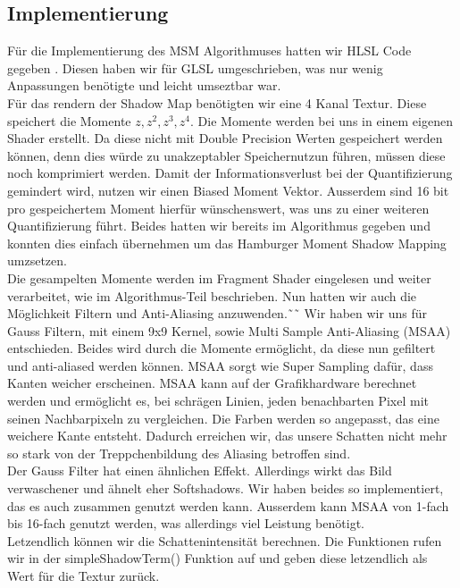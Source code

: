 \documentclass[runningheaders,a4paper]{llncs}
\begin{document}
\subsection{Implementierung}
Für die Implementierung des MSM Algorithmuses hatten wir HLSL Code gegeben \cite{msm}.
Diesen haben wir für GLSL umgeschrieben, was nur wenig Anpassungen benötigte und leicht umseztbar war.\\
Für das rendern der Shadow Map benötigten wir eine 4 Kanal Textur. Diese speichert die Momente $z,z^2,z^3,z^4$. Die Momente werden bei uns in einem eigenen Shader erstellt. Da diese nicht mit Double Precision Werten gespeichert werden können, denn dies würde zu unakzeptabler Speichernutzun führen, müssen diese noch komprimiert werden. Damit der Informationsverlust bei der Quantifizierung gemindert wird, nutzen wir einen Biased Moment Vektor. Ausserdem sind 16 bit pro gespeichertem Moment hierfür wünschenswert, was uns zu einer weiteren Quantifizierung führt. Beides hatten wir bereits im Algorithmus gegeben und konnten dies einfach übernehmen um das Hamburger Moment Shadow Mapping umzsetzen.\\
Die gesampelten Momente werden im Fragment Shader eingelesen und weiter verarbeitet, wie im Algorithmus-Teil beschrieben. Nun hatten wir auch die Möglichkeit Filtern und Anti-Aliasing anzuwenden.˜˜
Wir haben wir uns für Gauss Filtern, mit einem 9x9 Kernel, sowie Multi Sample Anti-Aliasing (MSAA) entschieden. Beides wird durch die Momente ermöglicht, da diese nun gefiltert und anti-aliased werden können. MSAA sorgt wie Super Sampling dafür, dass Kanten weicher erscheinen. MSAA kann auf der Grafikhardware berechnet werden und ermöglicht es, bei schrägen Linien, jeden benachbarten Pixel mit seinen Nachbarpixeln zu vergleichen. Die Farben werden so angepasst, das eine weichere Kante entsteht. Dadurch erreichen wir, das unsere Schatten nicht mehr so stark von der Treppchenbildung des Aliasing betroffen sind. \\Der Gauss Filter hat einen ähnlichen Effekt. Allerdings wirkt das Bild verwaschener und ähnelt eher Softshadows. Wir haben beides so implementiert, das es auch zusammen genutzt werden kann. Ausserdem kann MSAA von 1-fach bis 16-fach genutzt werden, was allerdings viel Leistung benötigt.\\
Letzendlich können wir die Schattenintensität berechnen.
Die Funktionen rufen wir in der simpleShadowTerm() Funktion auf und geben diese letzendlich als Wert für die Textur zurück.
\end{document}
